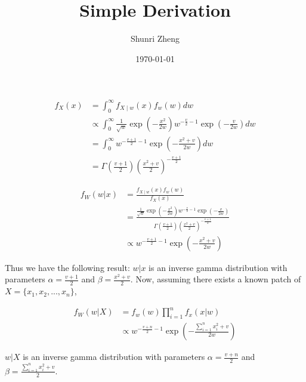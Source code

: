 \documentclass[12pt]{article}
\title{Simple Derivation}
\author{Shunri Zheng}
\date{\today}
\begin{document}
\maketitle



\begin{equation}
    \begin{split}
        f_X(x) & =\int_0^{\infty} f_{X \mid w}(x) f_w(w) d w \\ 
        & \propto \int_0^{\infty} \frac{1}{\sqrt{w}} \exp \left(-\frac{x^2}{2 w}\right) w^{-\frac{v}{2}-1} \exp \left(-\frac{v}{2 w}\right) d w \\ 
        & =\int_0^{\infty} w^{-\frac{v+1}{2}-1} \exp \left(-\frac{x^2+v}{2 w}\right) d w \\ 
        & =\Gamma\left(\frac{v+1}{2}\right)\left(\frac{x^2+v}{2}\right)^{-\frac{v+1}{2}}
    \end{split}
\end{equation}


\begin{equation}
    \begin{split}
        f_W(w|x) & =\frac{f_{X \mid w}(x) f_w(w)}{f_X(x)} \\  
        & =\frac{\frac{1}{\sqrt{w}} \exp \left(-\frac{x^2}{2 w}\right) w^{-\frac{v}{2}-1} \exp \left(-\frac{v}{2 w}\right)}{\Gamma\left(\frac{v+1}{2}\right)\left(\frac{x^2+v}{2}\right)^{-\frac{v+1}{2}}} \\
        & \propto w^{-\frac{v+1}{2}-1} \exp \left(-\frac{x^2+v}{2 w}\right) 
    \end{split}
\end{equation}

Thus we have the following result:
$w|x$ is an inverse gamma distribution with parameters $\alpha = \frac{v+1}{2}$ and $\beta = \frac{x^2+v}{2}$.
Now, assuming there exists a known patch of $X = \{x_1,x_2,...,x_n\}$,


\begin{equation}
    \begin{split}
        f_W(w|X) & =f_w(w)\prod_{i=1}^{n} f_x(x|w) \\
        &\propto w^{-\frac{v+n}{2}-1} \exp \left(-\frac{\sum\limits_{i=1}^n x_i^2+v}{2 w}\right) 
    \end{split}
\end{equation}

$w|X$ is an inverse gamma distribution with parameters $\alpha = \frac{v+n}{2}$ and $\beta = \frac{\sum\limits_{i=1}^n x_i^2+v}{2}$.
\end{document}
